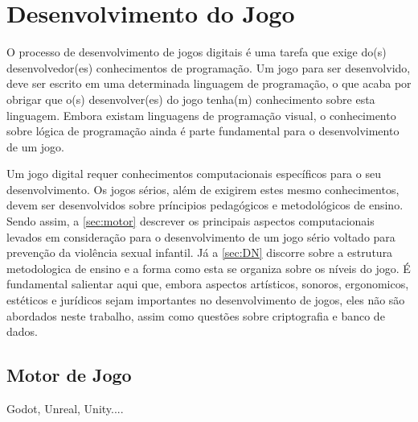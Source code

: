 \chapter{Desenvolvimento do Jogo}\label{ch:Desenvolvimento}


O processo de desenvolvimento de jogos digitais é uma tarefa que exige do(s) desenvolvedor(es) conhecimentos de programação. Um jogo para ser desenvolvido, deve ser escrito em uma determinada linguagem de programação, o que acaba por obrigar que o(s) desenvolver(es) do jogo tenha(m) conhecimento sobre esta linguagem. Embora existam linguagens de programação visual, o conhecimento sobre lógica de programação ainda é parte fundamental para o desenvolvimento de um jogo. 


Um jogo digital requer conhecimentos computacionais específicos para o seu desenvolvimento. Os jogos sérios, além de exigirem estes mesmo conhecimentos, devem ser desenvolvidos sobre príncipios pedagógicos e metodológicos de ensino. Sendo assim, a \autoref{sec:motor} descrever os principais aspectos computacionais levados em consideração para o desenvolvimento de um jogo sério voltado para prevenção da violência sexual infantil. Já a \autoref{sec:DN} discorre sobre a estrutura metodologica de ensino e a forma como esta se organiza sobre os níveis do jogo. É fundamental salientar aqui que, embora aspectos artísticos, sonoros, ergonomicos, estéticos e jurídicos sejam importantes no desenvolvimento de jogos, eles não são abordados neste trabalho, assim como questões sobre criptografia e banco de dados.








\section{Motor de Jogo}\label{sec:motor}

Godot, Unreal, Unity....

